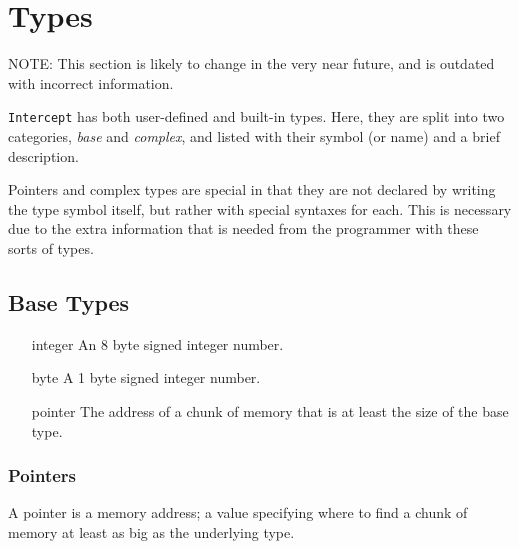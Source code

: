 \documentclass[12pt]{report}
\begin{document}
\chapter{Types}
\label{chpt:types}


NOTE: This section is likely to change in the very near future, and is outdated with incorrect information.

\verb|Intercept| has both user-defined and built-in types. Here, they are split into two categories, \emph{base} and \emph{complex}, and listed with their symbol (or name) and a brief description.


Pointers and complex types are special in that they are not declared by writing the type symbol itself, but rather with special syntaxes for each. This is necessary due to the extra information that is needed from the programmer with these sorts of types.

\section{Base Types}
\label{sec:types-base_types}

\begin{itemize}
\item[integer]  An 8 byte signed integer number.
\item[byte]     A 1 byte signed integer number.
\item[pointer]  The address of a chunk of memory that is at least the size of the base type.
\end{itemize}

\subsection*{Pointers}
\label{subsec:types-base_types-pointers}

A pointer is a memory address; a value specifying where to find a chunk of memory at least as big as the underlying type.
\end{document}
